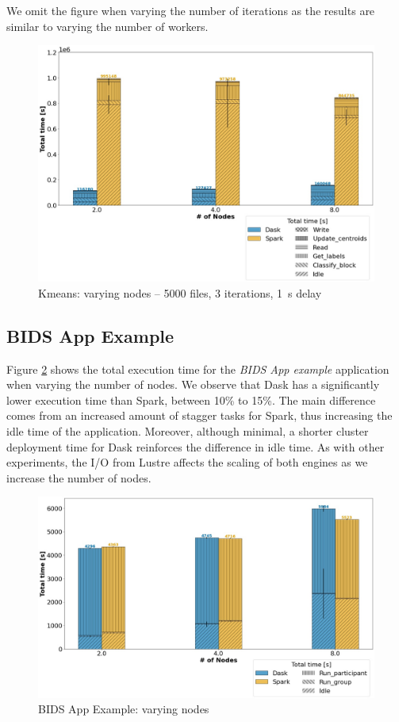 \documentclass[conference]{IEEEtran}
\begin{document}
We omit the figure when varying the number of iterations as the results are similar to varying the number of workers.
\begin{figure}[!t]
	\centering
	\includegraphics[clip,width=\columnwidth]{figures/stacked_kmeans_worker.jpg}
	\caption{Kmeans: varying nodes -- 5000 files, 3 iterations, \SI{1}{\second} delay}
	\label{fig:kmeans_worker}
\end{figure}

\subsection{BIDS App Example}
Figure \ref{fig:bids} shows the total execution time for the \textit{BIDS App example} application when varying the number of nodes.
We observe that Dask has a significantly lower execution time than Spark, between 10\% to 15\%.
The main difference comes from an increased amount of stagger tasks for Spark, thus increasing the idle time of the application.
Moreover, although minimal, a shorter cluster deployment time for Dask reinforces the difference in idle time.
As with other experiments, the I/O from Lustre affects the scaling of both engines as we increase the number of nodes.
\begin{figure}[!t]
	\centering
	\includegraphics[clip,width=\columnwidth]{figures/stacked_bids.jpg}
	\caption{BIDS App Example: varying nodes}
	\label{fig:bids}
\end{figure}
		
\end{document}
